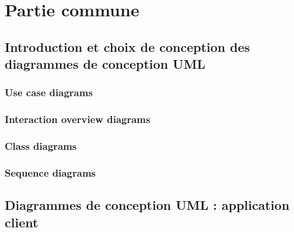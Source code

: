 \documentclass[]{report}
\begin{document}




\newpage

\tableofcontents

\newpage

\chapter{Partie commune}


\newpage




\section{Introduction et choix de conception des diagrammes de conception UML}



\subsection{Use case diagrams}

\newpage

\subsection{Interaction overview diagrams}



\newpage

\subsection{Class diagrams}

\newpage

\subsection{Sequence diagrams}

\newpage




\section{Diagrammes de conception UML : application client}
\end{document}
